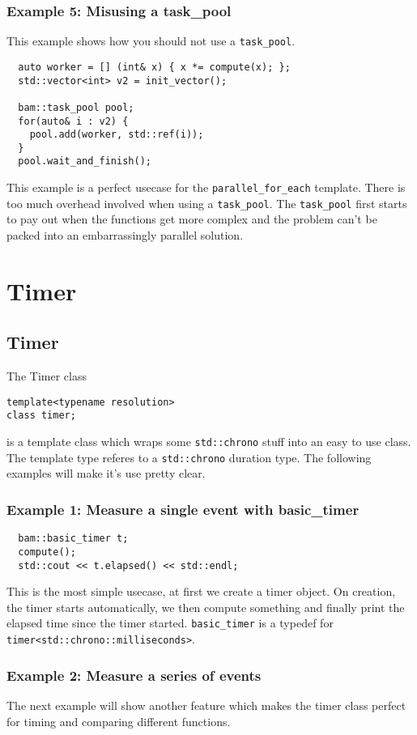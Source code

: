 \documentclass[11pt, a4paper]{article}
\begin{document}
\subsubsection{Example 5: Misusing a task\_pool}
This example shows how you should not use a \texttt{task\_pool}.

\begin{lstlisting}
  auto worker = [] (int& x) { x *= compute(x); };
  std::vector<int> v2 = init_vector();

  bam::task_pool pool;
  for(auto& i : v2) {
    pool.add(worker, std::ref(i));
  }
  pool.wait_and_finish();
\end{lstlisting}
This example is a perfect usecase for the \texttt{parallel\_for\_each} template. There is too much overhead involved when using a \texttt{task\_pool}. The \texttt{task\_pool} first starts to pay out when the functions get more complex and the problem can't be packed into an embarrassingly parallel solution.

\section{Timer}
\subsection{Timer}

The Timer class 
\begin{lstlisting}
template<typename resolution>
class timer;
\end{lstlisting}

 is a template class which wraps some \texttt{std::chrono} stuff into an easy to use class. The template type referes to a \texttt{std::chrono} duration type. The following examples  will make it's use pretty clear.
\subsubsection{Example 1: Measure a single event with basic\_timer}
\begin{lstlisting}
  bam::basic_timer t;
  compute();
  std::cout << t.elapsed() << std::endl;
\end{lstlisting}

This is the most simple usecase, at first we create a timer object. On creation, the timer starts automatically, we then compute something and finally print the elapsed time since the timer started. \texttt{basic\_timer} is a typedef for \texttt{timer<std::chrono::milliseconds>}.
\subsubsection{Example 2: Measure a series of events}
The next example will show another feature which makes the timer class perfect for timing and comparing different functions.
\end{document}
